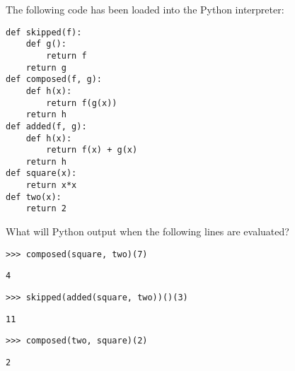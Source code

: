 \question The following code has been loaded into the Python
interpreter:

\begin{lstlisting}
def skipped(f):
    def g():
        return f
    return g
def composed(f, g):
    def h(x):
        return f(g(x))
    return h
def added(f, g):
    def h(x):
        return f(x) + g(x)
    return h
def square(x):
    return x*x
def two(x):
    return 2
\end{lstlisting}

What will Python output when the following lines are evaluated?
\begin{lstlisting}
>>> composed(square, two)(7)
\end{lstlisting}
\begin{solution}[0.2in]
\begin{lstlisting}
4
\end{lstlisting}
\end{solution}

\begin{lstlisting}
>>> skipped(added(square, two))()(3)
\end{lstlisting}
\begin{solution}[0.2in]
\begin{lstlisting}
11
\end{lstlisting}
\end{solution}

\begin{lstlisting}
>>> composed(two, square)(2)
\end{lstlisting}
\begin{solution}[0.2in]
\begin{lstlisting}
2
\end{lstlisting}
\end{solution}
